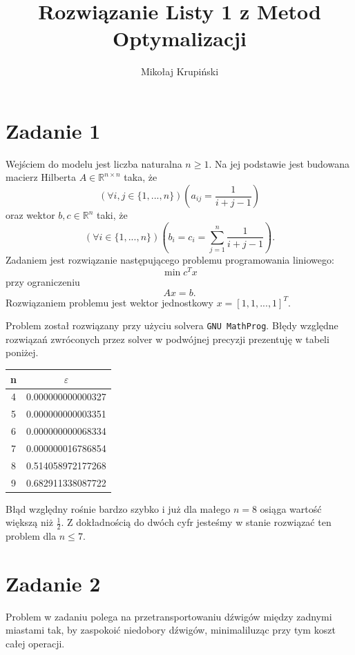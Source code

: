 \documentclass[12pt]{article}
\title{Rozwiązanie Listy 1 z Metod Optymalizacji}
\author{Mikołaj Krupiński}
\begin{document}
\maketitle

\section*{Zadanie 1}

Wejściem do modelu jest liczba naturalna $n \geq 1$. Na jej podstawie jest budowana macierz Hilberta $A \in \mathbb{R}^{n \times n}$ taka, że
\[ \left(\forall i, j \in \{1,...,n\}\right)\left(a_{ij} = \frac{1}{i+j-1}\right) \]
oraz wektor $b, c \in \mathbb{R}^n$ taki, że
\[ \left(\forall i \in \{1,...,n\}\right)\left(b_i = c_i = \sum_{j=1}^{n} \frac{1}{i+j-1}
\right). \]
Zadaniem jest rozwiązanie następującego problemu programowania liniowego:
\[ \min c^Tx \]
przy ograniczeniu
\[ Ax = b. \]
Rozwiązaniem problemu jest wektor jednostkowy $x = [1, 1, ..., 1]^T$.

Problem został rozwiązany przy użyciu solvera \texttt{GNU MathProg}. Błędy względne rozwiązań zwróconych przez solver w podwójnej precyzji prezentuję w tabeli poniżej.

\begin{table}[H]
    \centering
    \begin{tabular}{|c|c|}
        \hline
        n & $\varepsilon $ \\
        \hline
        4 & 0.000000000000327 \\
        5 & 0.000000000003351 \\
        6 & 0.000000000068334 \\
        7 & 0.000000016786854 \\
        8 & 0.514058972177268 \\
        9 & 0.682911338087722 \\
        \hline
    \end{tabular}
\end{table}

Błąd względny rośnie bardzo szybko i już dla małego $n=8$ osiąga wartość większą niż $\frac{1}{2}$. Z dokładnością do dwóch cyfr jesteśmy w stanie rozwiązać ten problem dla $n \leq 7$.

\section*{Zadanie 2}

Problem w zadaniu polega na przetransportowaniu dźwigów między zadnymi miastami tak, by zaspokoić niedobory dźwigów, minimaliluząc przy tym koszt całej operacji.
\end{document}
